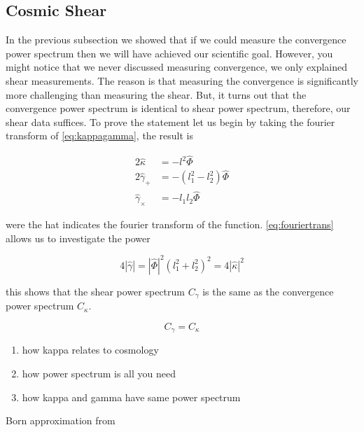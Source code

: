 \subsection{Cosmic Shear}
In the previous subsection we showed that if we could measure the convergence power spectrum then we will have achieved our scientific goal. However, you might notice that we never discussed measuring convergence, we only explained shear measurements. The reason is that measuring the convergence is significantly more challenging than measuring the shear. But, it turns out that the convergence power spectrum is identical to shear power spectrum, therefore, our shear data suffices. To prove the statement let us begin by taking the fourier transform of \autoref{eq:kappagamma}, the result is 

\begin{equation}
    \begin{split}
        2\hat{\kappa} &= -l^2 \hat{\Phi} \\
        2 \hat{\gamma}_+ &= -(l_1^2-l_2^2) \hat{\Phi} \\
        \hat{\gamma}_\times &= -l_1l_2 \hat{\Phi}
    \end{split}
    \label{eq:fouriertrans}
\end{equation}

were the hat indicates the fourier transform of the function. \autoref{eq:fouriertrans} allows us to investigate the power 

\begin{equation}
    4|\hat{\gamma}| = |\hat{\Phi}|^2 \left(l_1^2+l_2^2\right)^2 = 4 |\hat{\kappa}|^2
    \label{eq:fourierspace}
\end{equation}

this shows that the shear power spectrum $C_\gamma$ is the same as the convergence power spectrum $C_\kappa$.

\begin{equation}
    C_\gamma = C_\kappa
    \label{eq:convergenceshear}
\end{equation}

\begin{enumerate}
    \item how kappa relates to cosmology
    \item how power spectrum is all you need 
    \item how kappa and gamma have same power spectrum
\end{enumerate}
Born approximation from \cite{Bartelmann:2016dvf}


